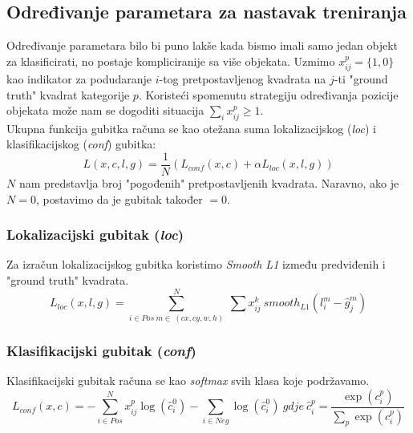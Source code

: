 \subsection{Određivanje parametara za nastavak treniranja}
Određivanje parametara bilo bi puno lakše kada bismo imali samo jedan objekt za klasificirati, no postaje kompliciranije sa više objekata.
Uzmimo $x^p_{ij}=\{1,0\}$ kao indikator za podudaranje $i$-tog pretpostavljenog kvadrata na $j$-ti "ground truth" kvadrat kategorije $p$.
Koristeći spomenutu strategiju određivanja pozicije objekata može nam se dogoditi situacija $\sum_i{x_{ij}^p} \geq 1$. \\
Ukupna funkcija gubitka računa se kao otežana suma lokalizacijskog (\emph{loc}) i klasifikacijskog (\emph{conf}) gubitka:
$$L(x,c,l,g)=\frac{1}{N}(L_{conf}(x,c)+\alpha L_{loc}(x,l,g))$$
$N$ nam predstavlja broj "pogođenih" pretpostavljenih kvadrata. Naravno, ako je $N=0$, postavimo da je gubitak također $=0$.
\subsubsection{Lokalizacijski gubitak (\emph{loc})}
Za izračun lokalizacijskog gubitka koristimo \emph{Smooth L1} između predviđenih i "ground truth" kvadrata.
$$L_{loc}(x,l,g)=\sum_{i\in Pos\ m \in\ (cx, cy, w, h)}^{N} \ \sum x_{ij}^k\ smooth_{L1}(l_i^m - \hat g_j^m)$$
\subsubsection{Klasifikacijski gubitak (\emph{conf})}
Klasifikacijski gubitak računa se kao \emph{softmax} svih klasa koje podržavamo. 
$$L_{conf}(x,c)=-\sum_{i \in Pos}^N x_{ij}^p \log(\hat c_i^0) - \sum_{i \in Neg} \log(\hat c_i^0 ) \ {gdje} \ \hat c_i^p=\frac{\exp(c_i^p)}{\sum_p \exp(c_i^p)}$$
